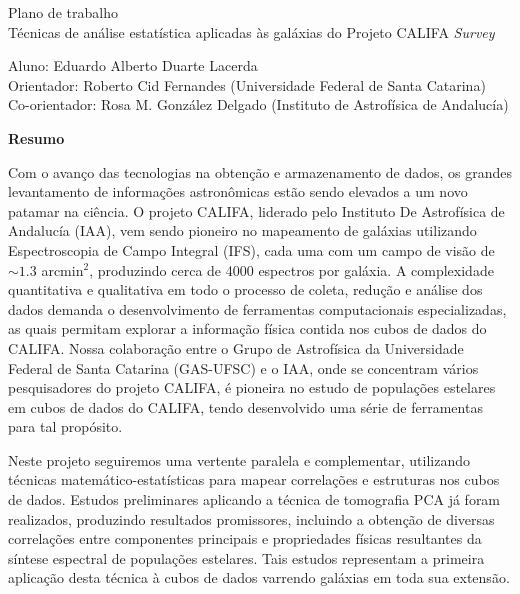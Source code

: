 \documentclass[a4paper,12pt]{article}
\begin{document}
\begin{center}
	\LARGE{Plano de trabalho}\\ \bigskip\large{Técnicas de análise estatística aplicadas às galáxias do Projeto CALIFA {\em Survey}}
\end{center}

\vspace{1cm}

\begin{flushleft}
	Aluno: Eduardo Alberto Duarte Lacerda\\
	Orientador: Roberto Cid Fernandes (Universidade Federal de Santa Catarina)\\
	Co-orientador: Rosa M. González Delgado (Instituto de Astrofísica de Andalucía)
\end{flushleft}

\begin{center}
	\textbf{Resumo}
\end{center}

Com o avanço das tecnologias na obtenção e armazenamento de dados, os grandes levantamento de informações astronômicas estão sendo elevados a um novo
patamar na ciência. O projeto CALIFA, liderado pelo Instituto De Astrofísica de Andalucía (IAA), vem sendo pioneiro no mapeamento de galáxias
utilizando Espectroscopia de Campo Integral (IFS), cada uma com um campo de visão de $\sim 1.3$ arcmin$^2$, produzindo cerca de 4000 espectros por
galáxia. A complexidade quantitativa e qualitativa em todo o processo de coleta, redução e análise dos dados demanda o desenvolvimento de ferramentas
computacionais especializadas, as quais permitam explorar a informação física contida nos cubos de dados do CALIFA. Nossa colaboração entre o Grupo de
Astrofísica da Universidade Federal de Santa Catarina (GAS-UFSC) e o IAA, onde se concentram vários pesquisadores do projeto CALIFA, é pioneira no
estudo de populações estelares em cubos de dados do CALIFA, tendo desenvolvido uma série de ferramentas para tal propósito.

Neste projeto seguiremos uma vertente paralela e complementar, utilizando técnicas matemático-estatísticas para mapear correlações e estruturas nos
cubos de dados. Estudos preliminares aplicando a técnica de tomografia PCA já foram realizados, produzindo resultados promissores, incluindo a
obtenção de diversas correlações entre componentes principais e propriedades físicas resultantes da síntese espectral de populações estelares. Tais
estudos representam a primeira aplicação desta técnica à cubos de dados varrendo galáxias em toda sua extensão.
\end{document}
